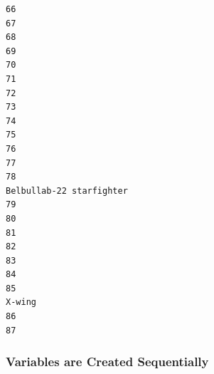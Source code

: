 \documentclass[
]{article}
\begin{document}
\begin{verbatim}
66                                                                                                         
67                                                                                                         
68                                                                                                         
69                                                                                                         
70                                                                                                         
71                                                                                                         
72                                                                                                         
73                                                                                                         
74                                                                                                         
75                                                                                                         
76                                                                                                         
77                                                                                                         
78                                                                                 Belbullab-22 starfighter
79                                                                                                         
80                                                                                                         
81                                                                                                         
82                                                                                                         
83                                                                                                         
84                                                                                                         
85                                                                                                   X-wing
86                                                                                                         
87                                                                                                         
\end{verbatim}

\subsubsection{Variables are Created
Sequentially}\label{variables-are-created-sequentially}
\end{document}
